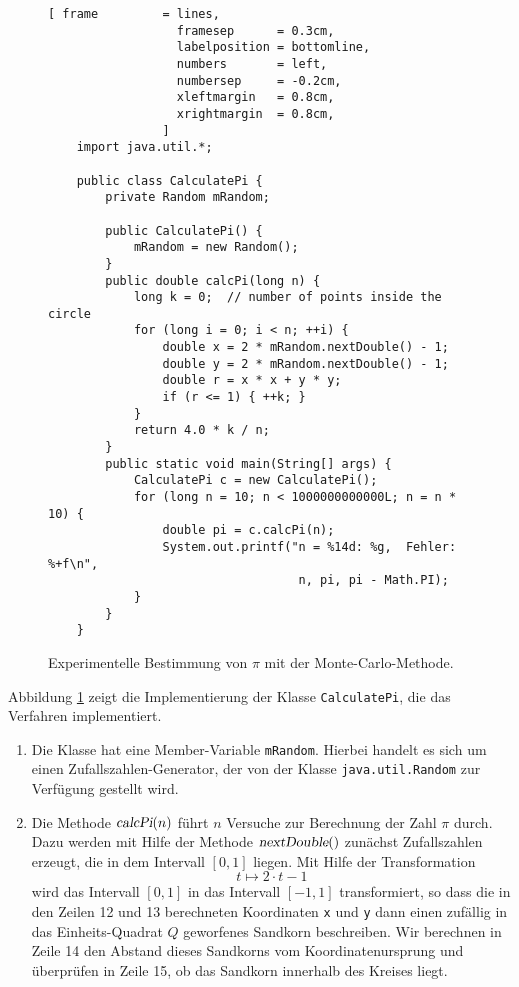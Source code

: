 \begin{figure}[!ht]
\centering
\begin{Verbatim}[ frame         = lines, 
                  framesep      = 0.3cm, 
                  labelposition = bottomline,
                  numbers       = left,
                  numbersep     = -0.2cm,
                  xleftmargin   = 0.8cm,
                  xrightmargin  = 0.8cm,
                ]
    import java.util.*;
    
    public class CalculatePi {
        private Random mRandom;
        
        public CalculatePi() {
            mRandom = new Random();
        }    
        public double calcPi(long n) {
            long k = 0;  // number of points inside the circle
            for (long i = 0; i < n; ++i) {
                double x = 2 * mRandom.nextDouble() - 1;
                double y = 2 * mRandom.nextDouble() - 1;
                double r = x * x + y * y;
                if (r <= 1) { ++k; }
            }
            return 4.0 * k / n;
        }    
        public static void main(String[] args) {
            CalculatePi c = new CalculatePi();
            for (long n = 10; n < 1000000000000L; n = n * 10) {
                double pi = c.calcPi(n);
                System.out.printf("n = %14d: %g,  Fehler: %+f\n", 
                                   n, pi, pi - Math.PI);
            }
        }
    }
\end{Verbatim}
\vspace*{-0.3cm}
\caption{Experimentelle Bestimmung von $\pi$ mit der Monte-Carlo-Methode.}
\label{fig:CalculatePi.java}
\end{figure}

Abbildung \ref{fig:CalculatePi.java} zeigt die Implementierung der Klasse \texttt{CalculatePi}, die das
Verfahren implementiert. 
\begin{enumerate}
\item Die Klasse hat eine Member-Variable \texttt{mRandom}.  Hierbei handelt es sich um einen
      Zufallszahlen-Generator, der von der Klasse \texttt{java.util.Random} zur Verf\"ugung gestellt wird.
\item Die Methode $\textsl{calcPi}(n)$ f\"uhrt $n$ Versuche zur Berechnung der Zahl $\pi$ durch.
      Dazu werden mit Hilfe der Methode $\textsl{nextDouble}()$ zun\"achst Zufallszahlen erzeugt, die in dem
      Intervall $[0,1]$ liegen.  Mit Hilfe der Transformation 
      \[ t \mapsto 2 \cdot t - 1  \]
      wird das Intervall $[0,1]$ in das Intervall $[-1, 1]$ transformiert, so dass die in den Zeilen 12 und 13 
      berechneten Koordinaten \texttt{x} und \texttt{y} dann einen zuf\"allig in das Einheits-Quadrat $Q$ 
      geworfenes Sandkorn beschreiben.  Wir berechnen in Zeile 14 den Abstand dieses Sandkorns vom
      Koordinatenursprung und \"uberpr\"ufen in Zeile 15, ob das Sandkorn innerhalb des Kreises liegt.
\end{enumerate}

